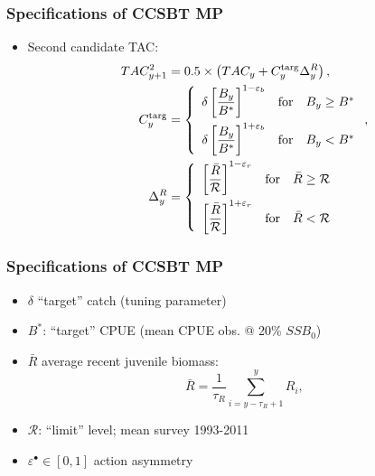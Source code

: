 \documentclass{beamer}
\newcommand{\ds}{\displaystyle}
\newcommand{\veps}{\varepsilon}
\begin{document}
\begin{frame}
    \frametitle{Specifications of CCSBT MP}
\begin{itemize}
    \item Second candidate TAC:
        \begin{align*}
            \ds TAC^2_{y+1} &= 0.5\times\left(TAC_y+C^{\rm targ}_y\Delta^R_y\right),\\
                \ds C^{\rm targ}_y &= \left\{\begin{array}{rcl}\ds{\delta \left[\frac{B_{y}}{B^*}\right]^{1-\veps_b}} & \mbox{for} & B_{y}\geq B^*\\[0.35cm]
\ds{\delta \left[\frac{B_{y}}{B^*}\right]^{1+\veps_b}} & \mbox{for} & B_{y}<B^*
    \end{array}\right.,\\
\ds \Delta^R_y &= \left\{\begin{array}{rcl}\ds{\left[\frac{\bar{R}}{\mathcal{R}}\right]^{1-\veps_r}} & \mbox{for} & \bar{R}\geq\mathcal{R}\\[0.35cm]
\ds{\left[\frac{\bar{R}}{\mathcal{R}}\right]^{1+\veps_r}} & \mbox{for} & \bar{R}<\mathcal{R}
\end{array}\right.
        \end{align*}
\end{itemize}
\end{frame}
\begin{frame}
    \frametitle{Specifications of CCSBT MP}
\begin{itemize}
    \item $\delta$ ``target'' catch (tuning parameter)
    \item $B^*$: ``target'' CPUE (mean CPUE obs. @ 20\% $SSB_0$)
    \item $\bar{R}$ average recent juvenile biomass:
      \begin{equation*}
      \ds \bar{R}=\frac{1}{\tau_R}\sum\limits_{i=y-\tau_R+1}^{y}R_i,
      \end{equation*}
    \item $\mathcal{R}$: ``limit'' level; mean survey 1993-2011
    \item $\veps^\bullet\in[0,1]$ action asymmetry 
\end{itemize}
\end{frame}
\end{document}
